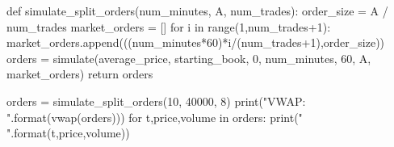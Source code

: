 def simulate_split_orders(num_minutes, A, num_trades):
    order_size = A / num_trades
    market_orders = []
    for i in range(1,num_trades+1):
        market_orders.append(((num_minutes*60)*i/(num_trades+1),order_size))
    orders = simulate(average_price, starting_book, 0, num_minutes, 60, A, market_orders)
    return orders
    
orders = simulate_split_orders(10, 40000, 8)
print("VWAP: {}".format(vwap(orders)))
for t,price,volume in orders:
    print("{} {} {}".format(t,price,volume))